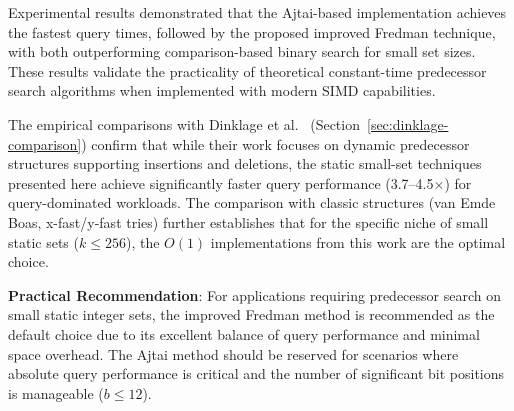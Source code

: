 Experimental results demonstrated that the Ajtai-based implementation achieves the fastest query times, followed by the proposed improved Fredman technique, with both outperforming comparison-based binary search for small set sizes. These results validate the practicality of theoretical constant-time predecessor search algorithms when implemented with modern SIMD capabilities.

The empirical comparisons with Dinklage et al.~\cite{Patrick_2021} (Section~\ref{sec:dinklage-comparison}) confirm that while their work focuses on dynamic predecessor structures supporting insertions and deletions, the static small-set techniques presented here achieve significantly faster query performance (3.7--4.5$\times$) for query-dominated workloads. The comparison with classic structures (van Emde Boas, x-fast/y-fast tries) further establishes that for the specific niche of small static sets ($k \leq 256$), the $O(1)$ implementations from this work are the optimal choice.

\textbf{Practical Recommendation}: For applications requiring predecessor search on small static integer sets, the improved Fredman method is recommended as the default choice due to its excellent balance of query performance and minimal space overhead. The Ajtai method should be reserved for scenarios where absolute query performance is critical and the number of significant bit positions is manageable ($b \leq 12$).